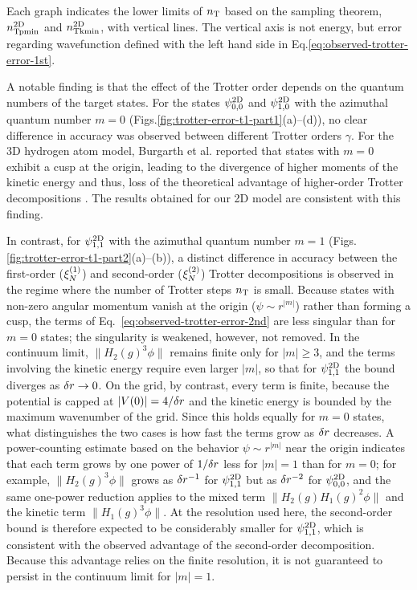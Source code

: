 \documentclass[aip-draft.tex]{subfiles}
\begin{document}
Each graph indicates the lower limits of $n_{\mathrm{T}}$ based on the sampling theorem,
$n_{\mathrm{Tpmin}}^{\mathrm{2D}}$ and $n_{\mathrm{Tkmin}}^{\mathrm{2D}}$, with vertical lines. The vertical axis is not
energy, but error regarding wavefunction defined with the left hand side in
Eq.\eqref{eq:observed-trotter-error-1st}.

A notable finding is that the effect of the Trotter order depends on the quantum
numbers of the target states. For the states $\psi^{\mathrm{2D}}_{0,0}$ and
$\psi^{\mathrm{2D}}_{1,0}$ with the azimuthal quantum number $m=0$
(Figs.\ref{fig:trotter-error-t1-part1}(a)--(d)), no clear difference in accuracy
was observed between different Trotter orders $\gamma$. For the 3D hydrogen atom
model, Burgarth et al. reported that states with $m=0$ exhibit a cusp at the
origin, leading to the divergence of higher moments of the kinetic energy and
thus, loss of the theoretical advantage of higher-order Trotter decompositions
\cite{Burgarth2024.PhysRevResearch.6.043155}. The results obtained for our 2D
model are consistent with this finding.

In contrast, for $\psi^{\mathrm{2D}}_{1,1}$ with the azimuthal quantum number $m=1$ (Figs.
\ref{fig:trotter-error-t1-part2}(a)--(b)), a distinct difference in accuracy
between the first-order ($\xi_{N}^{(1)}$) and second-order ($\xi_{N}^{(2)}$) Trotter
decompositions is observed in the regime where the number of Trotter steps $n_{\mathrm{T}}$
is small. Because states with non-zero angular momentum vanish at the origin
($\psi\sim r^{|m|}$) rather than forming a cusp, the terms of
Eq.~\eqref{eq:observed-trotter-error-2nd} are less singular than for $m=0$
states; the singularity is weakened, however, not removed. In the continuum
limit, $\|H_2(g)^3\phi\|$ remains finite only for $|m|\ge3$, and the terms
involving the kinetic energy require even larger $|m|$, so that for
$\psi^{\mathrm{2D}}_{1,1}$ the bound diverges as $\delta r\to0$. On the grid, by contrast,
every term is finite, because the potential is capped at $|V(0)|=4/\delta r$ and
the kinetic energy is bounded by the maximum wavenumber of the grid. Since this
holds equally for $m=0$ states, what distinguishes the two cases is how fast
the terms grow as $\delta r$ decreases. A power-counting estimate based on the
behavior $\psi\sim r^{|m|}$ near the origin indicates that each term grows by
one power of $1/\delta r$ less for $|m|=1$ than for $m=0$; for example,
$\|H_2(g)^3\phi\|$ grows as $\delta r^{-1}$ for $\psi^{\mathrm{2D}}_{1,1}$ but as
$\delta r^{-2}$ for $\psi^{\mathrm{2D}}_{0,0}$, and the same one-power reduction applies to
the mixed term $\|H_2(g)H_1(g)^2\phi\|$ and the kinetic term
$\|H_1(g)^3\phi\|$. At the resolution used here, the second-order bound is
therefore expected to be considerably smaller for $\psi^{\mathrm{2D}}_{1,1}$, which is
consistent with the observed advantage of the second-order decomposition.
Because this advantage relies on the finite resolution, it is not guaranteed to
persist in the continuum limit for $|m|=1$.
\end{document}
